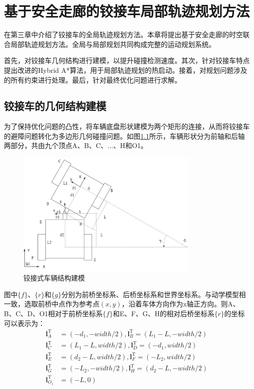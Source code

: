 \documentclass[master,academic]{ysuthesis} %
\begin{document}
	\chapter{基于安全走廊的铰接车局部轨迹规划方法}
	在第三章中介绍了铰接车的全局轨迹规划方法。本章将提出基于安全走廊的时空联合局部轨迹规划方法。全局与局部规划共同构成完整的运动规划系统。

	首先，对铰接车几何结构进行建模，以提升碰撞检测速度。其次，针对铰接车特点提出改进的Hybrid A*算法，用于局部轨迹规划的热启动。接着，对规划问题涉及的所有约束进行处理。最后，针对最终优化问题进行求解。

	\section{铰接车的几何结构建模}
	为了保持优化问题的凸性，将车辆底盘形状建模为两个矩形的连接，从而将铰接车的避障问题转化为多边形几何碰撞问题。如图\ref{fig:铰接车外观结构建模}所示，车辆形状分为前轴和后轴两部分，共由九个顶点A、B、C、...、H和O1。
	\begin{figure}[H]
		\centering
		\includegraphics[width=0.8\textwidth]{铰接车几何结构.png}
		\caption{铰接式车辆结构建模}
		\label{fig:铰接车外观结构建模}
	\end{figure}
	图中$\{f\}$、$\{r\}$和$\{g\}$分别为前桥坐标系、后桥坐标系和世界坐标系。与动学模型相一致，选取前桥中点作为参考点$(x,y)$，沿着车体方向作为x轴正方向。则A、B、C、D、O1相对于前桥坐标系$\{f\}$和E、F、G、H的相对后桥坐标系$\{r\}$的坐标可以表示为：
	\begin{equation}
		\begin{aligned}
			\bm{l}_{A}^{\mathrm{T}}&=( -d_1,-width/2 ) ,\bm{l}_{B}^{\mathrm{T}}=( L_1-L,-width/2 ) \\
			\bm{l}_{C}^{\mathrm{T}}&=( L_1-L,width/2 ) ,\bm{l}_{D}^{\mathrm{T}}=( -d_1,width/2 ) \\
			\bm{l}_{E}^{\mathrm{T}}&=( d_2-L,width/2 ) ,\bm{l}_{F}^{\mathrm{T}}=( -L_2,width/2 ) \\
			\bm{l}_{G}^{\mathrm{T}}&=( -L_2,-width/2 ) ,\bm{l}_{H}^{\mathrm{T}}=( d_2-L,-width/2 ) \\
			\bm{l}_{O_1}^{\mathrm{T}}&=( -L,0 ) 
		\end{aligned}
		\label{eq:铰接车顶点}
	\end{equation}
\end{document}
